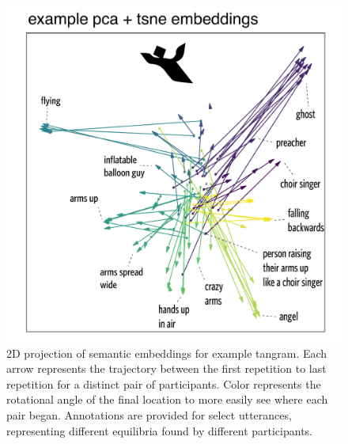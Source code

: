 \documentclass[alpha-refs]{wiley-article}
\begin{document}
\begin{figure}[t!]
\centering
\includegraphics[scale=.6]{tsne-tangramC_annotated.pdf}
\caption{2D projection of semantic embeddings for example tangram. Each arrow represents the trajectory between the first repetition to last repetition for a distinct pair of participants. Color represents the rotational angle of the final location to more easily see where each pair began. Annotations are provided for select utterances, representing different equilibria found by different participants.}
\label{fig:tsne}
\end{figure}
\end{document}
